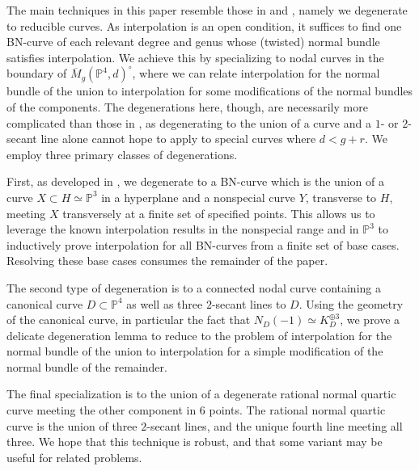 \documentclass[11pt]{amsart}
\newcommand{\pp}{\mathbb{P}}
\renewcommand{\bar}{\overline}
\newcommand{\isabel}[1]{{\color{purple} ($\spadesuit$ Isabel: #1)}}
\theoremstyle{definition}
\theoremstyle{remark}
\begin{document}

The main techniques in this paper resemble those in \cite{joint} and \cite{quadrics}, namely we degenerate to reducible curves.  As interpolation is an open condition, it suffices to find one BN-curve of each relevant degree and genus whose (twisted) normal bundle satisfies interpolation.  We achieve this by specializing to nodal curves in the boundary of $\bar{M}_g(\pp^4, d)^\circ$, where we can relate interpolation for the normal bundle of the union to interpolation for some modifications of the normal bundles of the components.  
The degenerations here, though, are necessarily more complicated than those in \cite{joint}, as degenerating to the union of a curve and a $1$- or $2$-secant line alone cannot hope to apply to special curves where $d < g + r$.
We employ three primary classes of degenerations.  

First, as developed in \cite{quadrics}, we degenerate to a BN-curve which is the union of a curve $X \subset H \simeq \pp^3$ in a hyperplane and a nonspecial curve $Y$, transverse to $H$, meeting $X$ transversely at a finite set of specified points.  This allows us to leverage the known interpolation results in the nonspecial range \cite{joint} and in $\pp^3$ \cite{vogt} to inductively prove interpolation for all BN-curves from a finite set of base cases.  Resolving these base cases consumes the remainder of the paper.

The second type of degeneration is to a connected nodal curve containing a canonical curve $D \subset \pp^4$ as well as three $2$-secant lines to $D$.  Using the geometry of the canonical curve, in particular the fact that $N_D(-1) \simeq K_D^{\oplus 3}$, we prove a delicate degeneration lemma to reduce to the problem of interpolation for the normal bundle of the union to interpolation for a simple modification of the normal bundle of the remainder.

The final specialization is to the union of a degenerate rational normal quartic curve meeting the other component in $6$ points.  The rational normal quartic curve is the union of three $2$-secant lines, and the unique fourth line meeting all three.  
We hope that this technique is robust, and that some variant may be useful for related problems.
\end{document}
